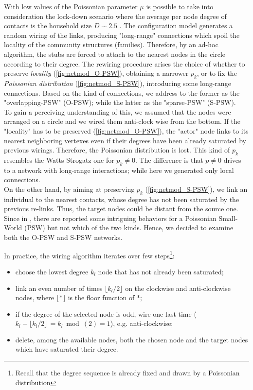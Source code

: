 \documentclass[a4paper,10pt,twoside]{book} %
\theoremstyle{definition}
\begin{document}
With low values of the Poissonian parameter $\mu$ is possible to take into consideration the lock-down scenario where the average per node degree of contacts is the household size $D \sim 2.5$ \cite{Thurner::NetBasedExpl}. The configuration model generates a random wiring of the links, producing "long-range" connections which spoil the locality of the community structures (families). Therefore, by an ad-hoc algorithm, the stubs are forced to attach to the nearest nodes in the circle according to their degree. 
The rewiring procedure arises the choice of whether to preserve \textit{locality}  (\autoref{fig:netmod_O-PSW}), obtaining a narrower $p_k$, or to fix the \textit{Poissonian distribution} (\autoref{fig:netmod_S-PSW}), introducing some long-range connections. Based on the kind of connections, we address to the former as the "overlapping-PSW" (O-PSW); while the latter as the "sparse-PSW" (S-PSW). \\
To gain a perceiving understanding of this, we assumed that the nodes were arranged on a circle and we wired them anti-clock wise from the bottom. If the "locality" has to be preserved (\autoref{fig:netmod_O-PSW}), the "actor" node links to its nearest neighboring vertexes even if their degrees have been already saturated by previous wirings. Therefore, the Poissonian distribution is lost. This kind of $ p_k$ resembles the Watts-Strogatz one for $ p_k \neq 0$. The difference is that $ p \neq 0$ drives to a network with long-range interactions; while here we generated only local connections.\\
On the other hand, by aiming at preserving $p_k$ (\autoref{fig:netmod_S-PSW}), we link an individual to the nearest contacts, whose degree has not been saturated by the previous re-links. Thus, the target nodes could be distant from the source one. Since in \cite{Thurner::Appendix_NetBasedExpl}, there are reported some intriguing behaviors for a Poissonian Small-World (PSW) but not which of the two kinds. Hence, we decided to examine both the O-PSW and S-PSW networks.

In practice, the wiring algorithm iterates over few steps\footnote{Recall that the degree sequence is already fixed and drawn by a Poissonian distribution}:
\begin{itemize}
	\item choose the lowest degree $k_l$ node that has not already been saturated;
	\item link an even number of times $\lfloor k_l /2 \rfloor$ on the clockwise and anti-clockwise nodes, where $\lfloor * \rfloor$ is the floor function of $*$;
	\item if the degree of the selected node is odd, wire one last time ($k_l - \lfloor k_l /2 \rfloor \, = k_l \bmod(2) =  1$), e.g. anti-clockwise;
	\item delete, among the available nodes, both the chosen node and the target nodes which have saturated their degree.
\end{itemize}
\end{document}
